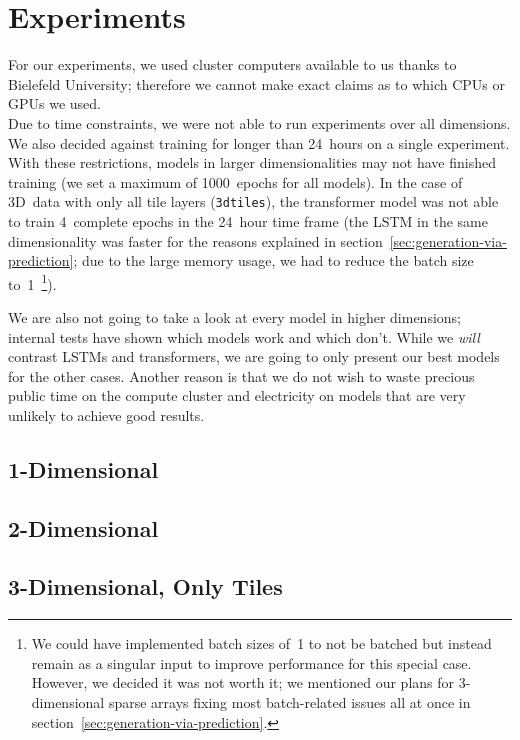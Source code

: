 \section{Experiments}

For our experiments, we used cluster computers available to us thanks
to Bielefeld University; therefore we cannot make exact claims as to
which CPUs or GPUs we used. \\
Due to time constraints, we were not able to run experiments over all
dimensions. We also decided against training for longer than 24~hours
on a single experiment. With these restrictions, models in larger
dimensionalities may not have finished training (we set a maximum of
1000~epochs for all models). In the case of 3D~data with only all tile
layers (\texttt{3dtiles}), the transformer model was not able to train
4~complete epochs in the 24~hour time frame (the LSTM in the same
dimensionality was faster for the reasons explained in
section~\ref{sec:generation-via-prediction}; due to the large memory
usage, we had to reduce the batch size to~1~\footnote{We could have
  implemented batch sizes of~1 to not be batched but instead remain as
  a singular input to improve performance for this special case.
  However, we decided it was not worth it; we mentioned our plans for
  3-dimensional sparse arrays fixing most batch-related issues all at
  once in section~\ref{sec:generation-via-prediction}.}).

We are also not going to take a look at every model in higher
dimensions; internal tests have shown which models work and which
don't. While we \emph{will} contrast LSTMs and transformers, we are
going to only present our best models for the other cases. Another
reason is that we do not wish to waste precious public time on the
compute cluster and electricity on models that are very unlikely to
achieve good results.

\subsection{1-Dimensional}

\subsection{2-Dimensional}

\subsection{3-Dimensional, Only Tiles}



